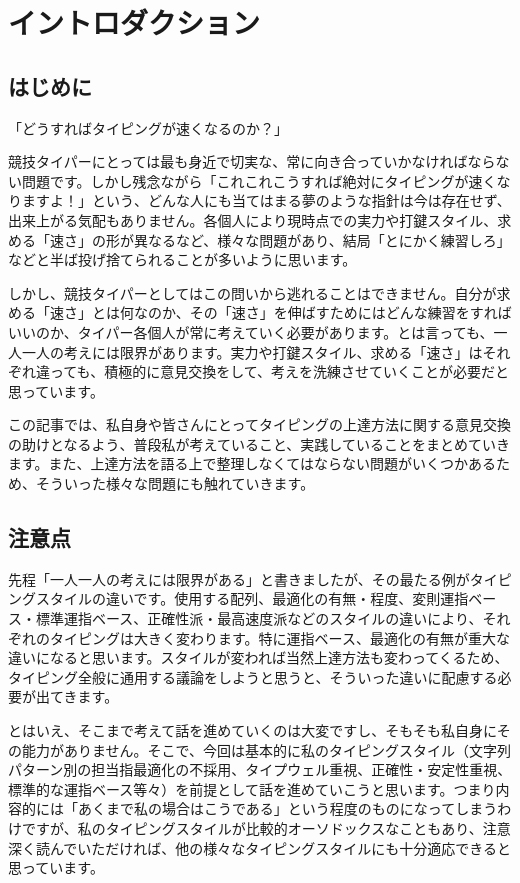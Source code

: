 
\section{イントロダクション}

\subsection{はじめに}

「どうすればタイピングが速くなるのか？」

競技タイパーにとっては最も身近で切実な、常に向き合っていかなければならない問題です。しかし残念ながら「これこれこうすれば絶対にタイピングが速くなりますよ！」という、どんな人にも当てはまる夢のような指針は今は存在せず、出来上がる気配もありません。各個人により現時点での実力や打鍵スタイル、求める「速さ」の形が異なるなど、様々な問題があり、結局「とにかく練習しろ」などと半ば投げ捨てられることが多いように思います。

しかし、競技タイパーとしてはこの問いから逃れることはできません。自分が求める「速さ」とは何なのか、その「速さ」を伸ばすためにはどんな練習をすればいいのか、タイパー各個人が常に考えていく必要があります。とは言っても、一人一人の考えには限界があります。実力や打鍵スタイル、求める「速さ」はそれぞれ違っても、積極的に意見交換をして、考えを洗練させていくことが必要だと思っています。

この記事では、私自身や皆さんにとってタイピングの上達方法に関する意見交換の助けとなるよう、普段私が考えていること、実践していることをまとめていきます。また、上達方法を語る上で整理しなくてはならない問題がいくつかあるため、そういった様々な問題にも触れていきます。

\subsection{注意点}

先程「一人一人の考えには限界がある」と書きましたが、その最たる例がタイピングスタイルの違いです。使用する配列、最適化の有無・程度、変則運指ベース・標準運指ベース、正確性派・最高速度派などのスタイルの違いにより、それぞれのタイピングは大きく変わります。特に運指ベース、最適化の有無が重大な違いになると思います。スタイルが変われば当然上達方法も変わってくるため、タイピング全般に通用する議論をしようと思うと、そういった違いに配慮する必要が出てきます。

とはいえ、そこまで考えて話を進めていくのは大変ですし、そもそも私自身にその能力がありません。そこで、今回は基本的に私のタイピングスタイル（文字列パターン別の担当指最適化の不採用、タイプウェル重視、正確性・安定性重視、標準的な運指ベース等々）を前提として話を進めていこうと思います。つまり内容的には「あくまで私の場合はこうである」という程度のものになってしまうわけですが、私のタイピングスタイルが比較的オーソドックスなこともあり、注意深く読んでいただければ、他の様々なタイピングスタイルにも十分適応できると思っています。

